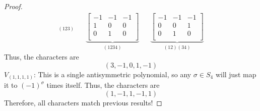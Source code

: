 \documentclass[../psets.tex]{subfiles}
\begin{document}
\begin{enumerate}
\begin{proof}
\begin{align*}
{            }_{(123)}&&
            \underbrace{
                \begin{bmatrix}
                    -1 & -1 & -1\\
                    1 & 0 & 0\\
                    0 & 1 & 0\\
                \end{bmatrix}
            }_{(1234)}&&
            \underbrace{
                \begin{bmatrix}
                    -1 & -1 & -1\\
                    0 & 0 & 1\\
                    0 & 1 & 0\\
                \end{bmatrix}
            }_{(12)(34)}
        \end{align*}
        Thus, the characters are
        \begin{equation*}
            (3,-1,0,1,-1)
        \end{equation*}
        \underline{$V_{(1,1,1,1)}$}: This is a single antisymmetric polynomial, so any $\sigma\in S_4$ will just map it to $(-1)^\sigma$ times itself. Thus, the characters are
        \begin{equation*}
            (1,-1,1,-1,1)
        \end{equation*}
        Therefore, all characters match previous results!
    \end{proof}
\end{enumerate}
\end{document}
